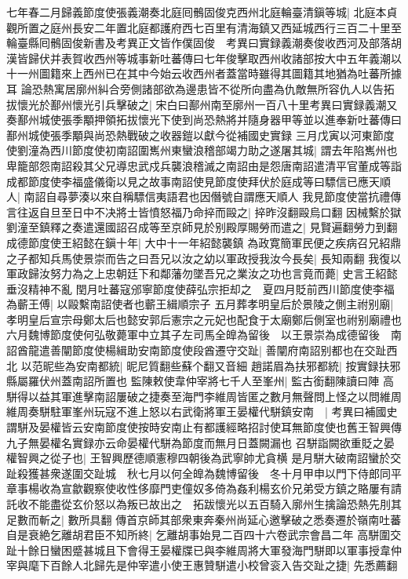 七年春二月歸義節度使張義潮奏北庭囘鶻固俊克西州北庭輪臺清鎭等城|{
	北庭本貞觀所置之庭州長安二年置北庭都護府西七百里有清海鎮又西延城西行三百二十里至輪臺縣囘鶻固俊新書及考異正文皆作僕固俊　考異曰實録義潮奏俊收西河及部落胡漢皆歸伏并表賀收西州等城事新吐蕃傳曰七年俊擊取西州收諸部按大中五年義潮以十一州圖籍來上西州已在其中今始云收西州者蓋當時雖得其圖籍其地猶為吐蕃所據耳}
論恐熱寓居廓州糾合旁側諸部欲為邊患皆不從所向盡為仇敵無所容仇人以告拓拔懷光於鄯州懷光引兵擊破之|{
	宋白曰鄯州南至廓州一百八十里考異曰實録義潮又奏鄯州城使張季顒押領拓拔懷光下使到尚恐熱將并隨身器甲等並以進奉新吐蕃傳曰鄯州城使張季顒與尚恐熱戰破之收器鎧以獻今從補國史實録}
三月戊寅以河東節度使劉潼為西川節度使初南詔圍嶲州東蠻浪稽部竭力助之遂屠其城|{
	謂去年陷嶲州也}
卑籠部怨南詔殺其父兄導忠武戍兵襲浪稽滅之南詔由是怨唐南詔遣清平官董成等詣成都節度使李福盛儀衛以見之故事南詔使見節度使拜伏於庭成等曰驃信已應天順人|{
	南詔自尋夢湊以來自稱驃信夷語君也因僭號自謂應天順人}
我見節度使當抗禮傳言往返自旦至日中不决將士皆憤怒福乃命捽而毆之|{
	捽昨沒翻毆烏口翻}
因械繫於獄劉潼至鎮釋之奏遣還國詔召成等至京師見於别殿厚賜勞而遣之|{
	見賢遍翻勞力到翻}
成德節度使王紹懿在鎭十年|{
	大中十一年紹懿襲鎮}
為政寛簡軍民便之疾病召兄紹鼎之子都知兵馬使景崇而告之曰吾兄以汝之幼以軍政授我汝今長矣|{
	長知兩翻}
我復以軍政歸汝努力為之上忠朝廷下和鄰藩勿墜吾兄之業汝之功也言竟而薨|{
	史言王紹懿垂沒精神不亂}
閏月吐蕃寇邠寧節度使薛弘宗拒却之　夏四月貶前西川節度使李福為蘄王傅|{
	以毆繫南詔使者也蘄王緝順宗子}
五月葬孝明皇后於景陵之側主祔别廟|{
	孝明皇后宣宗母鄭太后也懿安郭后憲宗之元妃也配食于太廟鄭后側室也祔别廟禮也}
六月魏博節度使何弘敬薨軍中立其子左司馬全皥為留後　以王景崇為成德留後　南詔酋龍遣善闡節度使楊緝助安南節度使段酋遷守交趾|{
	善闡府南詔别都也在交趾西北}
以范昵些為安南都統|{
	昵尼質翻些蘇个翻又音細}
趙諾眉為扶邪都統|{
	按實録扶邪縣屬羅伏州蓋南詔所置也}
監陳敕使韋仲宰將七千人至峯州|{
	監古銜翻陳讀曰陣}
高駢得以益其軍進擊南詔屢破之捷奏至海門李維周皆匿之數月無聲問上怪之以問維周維周奏駢駐軍峯州玩寇不進上怒以右武衛將軍王晏權代駢鎮安南　|{
	考異曰補國史謂駢及晏權皆云安南節度使按時安南止有都護經略招討使耳無節度使也舊王智興傳九子無晏權名實録亦云命晏權代駢為節度而無月日蓋闕漏也}
召駢詣闕欲重貶之晏權智興之從子也|{
	王智興歷德順憲穆四朝後為武寧帥尤貪横}
是月駢大破南詔蠻於交趾殺獲甚衆遂圍交趾城　秋七月以何全皥為魏博留後　冬十月甲申以門下侍郎同平章事楊收為宣歙觀察使收性侈靡門吏僮奴多倚為姦利楊玄价兄弟受方鎮之賂屢有請託收不能盡從玄价怒以為叛已故出之　拓跋懷光以五百騎入廓州生擒論恐熱先刖其足數而斬之|{
	數所具翻}
傳首京師其部衆東奔秦州尚延心邀擊破之悉奏遷於嶺南吐蕃自是衰絶乞離胡君臣不知所終|{
	乞離胡事始見二百四十六卷武宗會昌二年}
高駢圍交趾十餘日蠻困蹙甚城且下會得王晏權牒已與李維周將大軍發海門駢即以軍事授韋仲宰與麾下百餘人北歸先是仲宰遣小使王惠贊駢遣小校曾衮入告交趾之捷|{
	先悉薦翻}
